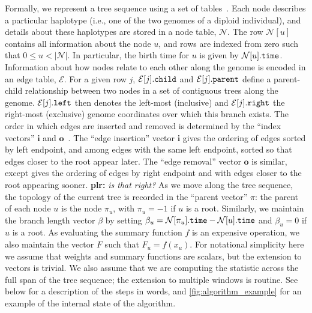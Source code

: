 \documentclass{article}
\newcommand{\Nt}{\mathcal{N}}  %
\newcommand{\Et}{\mathcal{E}}  %
\newcommand{\prop}[1]{.\mbox{\texttt{#1}}} %
\newcommand{\indexin}[0]{\ensuremath{\mathbf{i}}}
\newcommand{\indexout}[0]{\ensuremath{\mathbf{o}}}
\newcommand{\plr}[1]{{\color{blue}\textbf{plr:} \it #1}}
\begin{document}
Formally, we represent a tree sequence using a set of tables~\citep{kelleher2018efficient}.
Each node describes a particular haplotype (i.e., one of the two genomes of a diploid individual),
and details about these haplotypes are stored in a node table, $\Nt$.
The row $\Nt[u]$ contains all information about the node $u$, and rows
are indexed from zero such that $0 \leq u < |\Nt|$.
In particular, the birth time for $u$ is given by $\Nt[u]\prop{time}$.
Information about how nodes relate to each
other along the genome is encoded in an edge table, $\Et$.
For a given row $j$, $\Et[j]\prop{child}$ and $\Et[j]\prop{parent}$
define a parent-child relationship between two nodes in a set of
contiguous trees along the genome. $\Et[j]\prop{left}$ then denotes
the left-most (inclusive) and $\Et[j]\prop{right}$ the right-most
(exclusive) genome coordinates over which this branch exists.
The order in which edges are inserted and removed is determined
by the ``index vectors'' $\indexin$ and $\indexout$~\citep{kelleher2016efficient}.
The ``edge insertion'' vector $\indexin$ gives the ordering of edges
sorted by left endpoint, and among edges with the same left endpoint,
sorted so that edges closer to the root appear later.
The ``edge removal'' vector $\indexout$ is similar, except gives the ordering of edges
by right endpoint and with edges closer to the root appearing sooner.
\plr{is that right?}
As we move along the tree sequence, the topology of the current tree is recorded in the
``parent vector'' $\pi$: the parent of each node $u$ is the node $\pi_u$,
with $\pi_u = -1$ if $u$ is a root.
Similarly, we maintain the branch length vector $\beta$ by setting
$\beta_u = \Nt[\pi_u]\prop{time} - \Nt[u]\prop{time}$ and
$\beta_u = 0$ if $u$ is a root. As evaluating the summary function
$f$ is an expensive operation, we also maintain the vector $F$
such that $F_u = f(x_u)$. For notational simplicity here we assume
that weights and summary functions are scalars, but the extension to
vectors is trivial. We also assume that we are computing the statistic
across the full span of the tree sequence; the extension to multiple windows is routine.
See below for a description of the steps in words,
and \autoref{fig:algorithm_example} for an example of the internal state of the algorithm.
\end{document}
